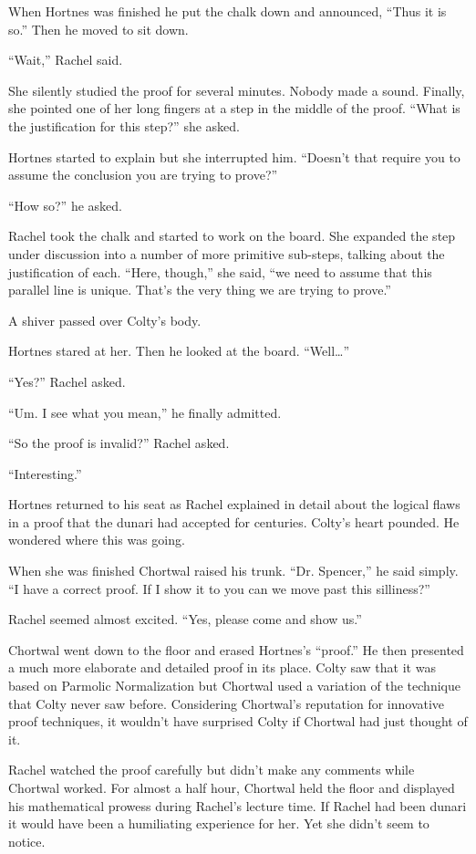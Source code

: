 When Hortnes was finished he put the chalk down and announced, ``Thus it is so.'' Then he moved
to sit down.

``Wait,'' Rachel said.

She silently studied the proof for several minutes. Nobody made a sound. Finally, she pointed
one of her long fingers at a step in the middle of the proof. ``What is the justification for
this step?'' she asked.

Hortnes started to explain but she interrupted him. ``Doesn't that require you to assume
the conclusion you are trying to prove?''

``How so?'' he asked.

Rachel took the chalk and started to work on the board. She expanded the step under discussion
into a number of more primitive sub-steps, talking about the justification of each. ``Here,
though,'' she said, ``we need to assume that this parallel line is unique. That's the
very thing we are trying to prove.''

A shiver passed over Colty's body.

Hortnes stared at her. Then he looked at the board. ``Well\ldots''

``Yes?'' Rachel asked.

``Um. I see what you mean,'' he finally admitted.

``So the proof is invalid?'' Rachel asked.

``Interesting.''

Hortnes returned to his seat as Rachel explained in detail about the logical flaws in a proof
that the dunari had accepted for centuries. Colty's heart pounded. He wondered where this was
going.

When she was finished Chortwal raised his trunk. ``Dr. Spencer,'' he said simply. ``I have a
correct proof. If I show it to you can we move past this silliness?''

Rachel seemed almost excited. ``Yes, please come and show us.''

Chortwal went down to the floor and erased Hortnes's ``proof.'' He then presented a much more
elaborate and detailed proof in its place. Colty saw that it was based on Parmolic Normalization
but Chortwal used a variation of the technique that Colty never saw before. Considering
Chortwal's reputation for innovative proof techniques, it wouldn't have surprised Colty if
Chortwal had just thought of it.

Rachel watched the proof carefully but didn't make any comments while Chortwal worked. For
almost a half hour, Chortwal held the floor and displayed his mathematical prowess during
Rachel's lecture time. If Rachel had been dunari it would have been a humiliating experience for
her. Yet she didn't seem to notice.

